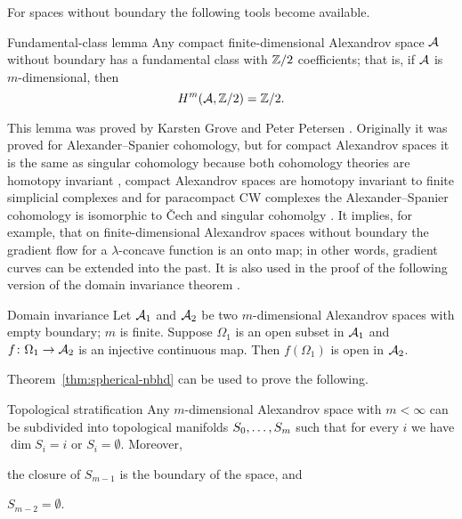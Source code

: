 For spaces without boundary the following tools become available.

\begin{thm}{Fundamental-class lemma}\label{lem:fund-class}
Any compact finite-dimensional Alexandrov space $\mathcal{A}$ without boundary has a fundamental class with $\mathbb{Z}/2$ coefficients;
that is, if $\mathcal{A}$ is $m$-dimensional, then
\[H^m(\mathcal{A},\mathbb{Z}/2)=\mathbb{Z}/2.\]

\end{thm}

This lemma was proved by Karsten Grove and Peter Petersen \cite{grove-petersen}.
Originally it was proved for Alexander--Spanier cohomology, but for compact Alexandrov spaces it is the same as singular cohomology because both cohomology theories are homotopy invariant \cite{Spanier}, compact Alexandrov spaces are homotopy invariant to finite simplicial complexes and  for paracompact  CW complexes the Alexander--Spanier cohomology is isomorphic to \v{C}ech  and singular cohomolgy \cite{Spanier}.
It implies, for example, that on finite-dimensional Alexandrov spaces without boundary 
the gradient flow for a $\lambda$-concave function is an onto map;
in other words, gradient curves can be extended into the past.
It is also used in the proof of the following version of the domain invariance theorem \cite[Theorem 3.2]{kapovitch-zhu}.

\begin{thm}{Domain invariance}\label{thm-inv-domain}
Let $\mathcal{A}_1$ and $\mathcal{A}_2$ be two $m$-dimensional Alexandrov spaces with empty boundary; $m$ is finite.
Suppose $\Omega_1$ is an open subset in $\mathcal{A}_1$ and $f\colon\Omega_1\to \mathcal{A}_2$ is an injective continuous map.
Then $f(\Omega_1)$ is open in $\mathcal{A}_2$.
\end{thm}

Theorem~\ref{thm:spherical-nbhd} can be used to prove the following. 

\begin{thm}{Topological stratification}\label{thm:top-stratification}
Any $m$-dimensional Alexandrov space with $m<\infty$ can be subdivided into topological manifolds $S_0,\dots,S_m$ such that for every $i$ we have $\dim S_i=i$ or $S_i=\emptyset$.
Moreover,
\begin{subthm}{}
the closure of $S_{m-1}$ is the boundary of the space, and
\end{subthm}

\begin{subthm}{}
$S_{m-2}=\emptyset$.
\end{subthm}

\end{thm}

